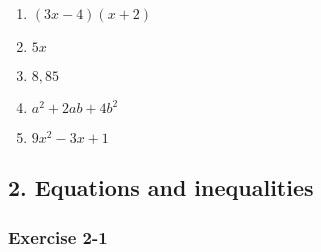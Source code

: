 {\begin{multicols}{3}
\begin{enumerate}[noitemsep, label=\textbf{\arabic*}. ]
\item $(3x - 4)(x + 2)$%
\item $5x$%
\item $8,85$ %
\item $a^2+2ab+4b^2$
\item $9x^2-3x+1$
\end{enumerate}

\end{multicols}


\subsection* {2. Equations and inequalities}
\subsubsection*{Exercise 2-1} %

}
